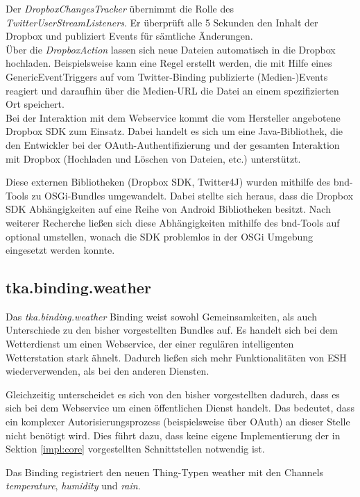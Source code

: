Der \textit{DropboxChangesTracker} übernimmt die Rolle des \textit{TwitterUserStreamListeners}. Er überprüft alle 5 Sekunden den Inhalt der Dropbox und publiziert Events für sämtliche Änderungen.\\

Über die \textit{DropboxAction} lassen sich neue Dateien automatisch in die Dropbox hochladen. Beispielsweise kann eine Regel erstellt werden, die mit Hilfe eines GenericEventTriggers auf vom Twitter-Binding publizierte (Medien-)Events reagiert und daraufhin über die Medien-URL die Datei an einem spezifizierten Ort speichert.\\

Bei der Interaktion mit dem Webservice kommt die vom Hersteller angebotene Dropbox SDK zum Einsatz. Dabei handelt es sich um eine Java-Bibliothek, die den Entwickler bei der OAuth-Authentifizierung und der gesamten Interaktion mit Dropbox (Hochladen und Löschen von Dateien, etc.) unterstützt. 

Diese externen Bibliotheken (Dropbox SDK, Twitter4J) wurden mithilfe des bnd-Tools\cite{bnd} zu OSGi-Bundles umgewandelt. Dabei stellte sich heraus, dass die Dropbox SDK Abhängigkeiten auf eine Reihe von Android Bibliotheken besitzt. Nach weiterer Recherche ließen sich diese Abhängigkeiten mithilfe des bnd-Tools auf optional umstellen, wonach die SDK problemlos in der OSGi Umgebung eingesetzt werden konnte. 




\subsection{tka.binding.weather}
Das \textit{tka.binding.weather} Binding weist sowohl Gemeinsamkeiten, als auch Unterschiede zu den bisher vorgestellten Bundles auf. Es handelt sich bei dem Wetterdienst um einen Webservice, der einer regulären intelligenten Wetterstation stark ähnelt. Dadurch ließen sich mehr Funktionalitäten von ESH wiederverwenden, als bei den anderen Diensten.

Gleichzeitig unterscheidet es sich von den bisher vorgestellten dadurch, dass es sich bei dem Webservice um einen öffentlichen Dienst handelt. Das bedeutet, dass ein komplexer Autorisierungsprozess (beispielsweise über OAuth) an dieser Stelle nicht benötigt wird. Dies führt dazu, dass keine eigene Implementierung der in Sektion \ref{impl:core} vorgestellten Schnittstellen notwendig ist. 

Das Binding registriert den neuen Thing-Typen \glqq weather\grqq{} mit den Channels \textit{temperature}, \textit{humidity} und \textit{rain}. 

